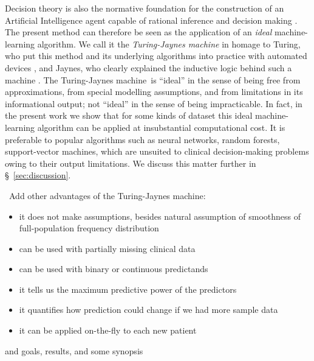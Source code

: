 \documentclass[utf8]{FrontiersinHarvard} %
\newcommand*{\pencil}{{\fontencoding{U}\fontfamily{fontawesometwo}\selectfont\symbol{210}}}
\newcommand{\mynotep}[1]{{\color{notecolour}\pencil\ #1}}
\newcommand*{\sect}{\S}%
\newcommand*{\chap}{ch.}%
\newcommand*{\chaps}{chs}%
\renewcommand*{\|}[1][]{\nonscript\:#1\vert\nonscript\:\mathopen{}}
\newcommand*{\tjm}{Turing-Jaynes machine}
\begin{document}
Decision theory is also the normative foundation for the construction of an Artificial Intelligence agent capable of rational inference and decision making \citetext{\citealp[\chap~IV]{russelletal1995_r2022}; \citealp[\chaps~1--2]{jaynes1994_r2003}}. The present method can therefore be seen as the application of an \emph{ideal} machine-learning algorithm. We call it the \emph{Turing-Jaynes machine}  in homage to Turing, who put this method and its underlying algorithms into practice with automated devices \citep{good1979}, and Jaynes, who clearly explained the inductive logic behind such a machine \citep{jaynes1994_r2003}. The \tjm\ is \enquote{ideal} in the sense of being free from approximations, from special modelling assumptions, and from limitations in its informational output; not \enquote{ideal} in the sense of being impracticable. In fact, in the present work we show that for some kinds of dataset this ideal machine-learning algorithm can be applied at insubstantial computational cost. It is preferable to popular algorithms such as neural networks, random forests, support-vector machines, which are unsuited to clinical decision-making problems owing to their output limitations. We discuss this matter further in \sect~\ref{sec:discussion}.

%
%

\mynotep{Add other advantages of the \tjm: 
  \begin{itemize}
  \item it does not make assumptions, besides natural assumption of smoothness of full-population frequency distribution
  \item can be used with partially missing clinical data
  \item can be used with binary or continuous predictands
  \item it tells us the maximum predictive power of the predictors
  \item it quantifies how prediction could change if we had more sample data
  \item it can be applied on-the-fly to each new patient
  \end{itemize}
  and goals, results, and some synopsis}
\end{document}
